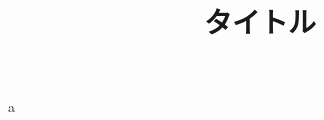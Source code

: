 \documentclass[a4paper, 10pt]{jsarticle}
\title{タイトル}
\author{}
\begin{document}
\maketitle

\begin{dfn}{}
	a
\end{dfn}
\end{document}
